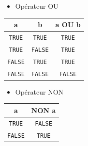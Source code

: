 \documentclass[
]{book}
\newcounter{none} %
\providecommand{\tightlist}{%
  \setlength{\itemsep}{0pt}\setlength{\parskip}{0pt}}
\begin{document}
\begin{itemize}
\tightlist
\item
  Opérateur OU
\end{itemize}

{\def\LTcaptype{none} %
\begin{longtable}[]{@{}ccc@{}}
\toprule\noalign{}
a & b & a OU b \\
\midrule\noalign{}
\endhead
\bottomrule\noalign{}
\endlastfoot
\texttt{TRUE} & \texttt{TRUE} & \texttt{TRUE} \\
\texttt{TRUE} & \texttt{FALSE} & \texttt{TRUE} \\
\texttt{FALSE} & \texttt{TRUE} & \texttt{TRUE} \\
\texttt{FALSE} & \texttt{FALSE} & \texttt{FALSE} \\
\end{longtable}
}

\begin{itemize}
\tightlist
\item
  Opérateur NON
\end{itemize}

{\def\LTcaptype{none} %
\begin{longtable}[]{@{}cc@{}}
\toprule\noalign{}
a & NON a \\
\midrule\noalign{}
\endhead
\bottomrule\noalign{}
\endlastfoot
\texttt{TRUE} & \texttt{FALSE} \\
\texttt{FALSE} & \texttt{TRUE} \\
\end{longtable}
}
\end{document}

